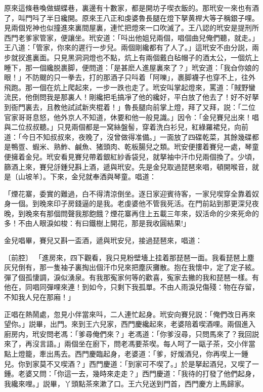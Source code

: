 原來這條巷喚做蝴蝶巷，裏邊有十數家，都是開坊子喫衣飯的。那玳安一來也有酒了，叫門呌了半日纔開。原來王八正和虔婆魯長腿在燈下拏黄桿大等子稱銀子哩。見兩個兇神也似撞進來裏間屋裏，連忙把燈來一口吹滅了。王八認的玳安是提刑所西門老爹家管家，便讓坐。玳安道：「呌出他姐兒兩個，唱個曲兒俺們聽，就走。」王八道：「管家，你來的遲行一步兒。兩個剛纔都有了人了。」這玳安不由分説，兩步就扠進裏面。只見黑洞洞燈也不點，炕上有兩個戴白毡帽子的酒太公，一個炕上睡下，那一個纔脱裹脚，便問道：「是甚麽人進屋裏來了？」玳安道：「我㒲你娘的眼！」不防颼的只一拳去，打的那酒子只呌着「阿嚛」，裹脚襪子也穿不上，往外飛跑。那一個在炕上爬起來，一步一跌也走了。玳安叫掌起燈來，罵道：「賊野蠻流民，他倒問我是那裏人！剛纔把毛搞凈了他的纔好，平白放了他去了！好不好拏到衙門裏去，且教他試試新夾棍着！」魯長腿向前掌上燈，拜了又拜，説：「二位官家哥哥息怒，他外京人不知道，休要和他一般見識。」因令：「金兒賽兒出來！唱與二位叔叔聽。」只見兩個都是一窝絲盤髻，穿着洗白衫兒，紅綠羅裙兒，向前道：「今日不知叔叔來，夜晚了，沒曾做得准備。」一面放了四碟乾菜，其餘幾碟都是鴨疍、蝦米、熟鮓、鹹魚、猪頭肉、乾板腸兒之類。玳安便摟着賽兒一處，琴童便擁着金兒。玳安看見賽兒帶着銀紅紗香袋兒，就拏袖中汗巾兒兩個換了。少頃，篩酒上來，賽兒㧱鍾兒斟上酒，遞與玳安。先是金兒取過琵琶來唱，頓開喉音，就是〔山坡羊〕。下來，金兒就奉酒與琴童。唱道：

\begin{myquote}
「煙花寨，委實的難過，白不得清涼倒坐。逐日家迎賓待客，一家兒喫穿全靠着奴身一個。到晚來印子房錢逼的是我。老虔婆他不管我死活。在門前跕到那更深兒夜晚，到晚來有那個問聲我那飽餓？煙花寨再住上五載三年來，奴活命的少來死命的多！不由人眼淚如梭：有曰鐵樹上開花，那是我收圓結果!」
\end{myquote}

金兒唱畢，賽兒又斟一盃酒，遞與玳安兒，接過琵琶來，唱道：

\begin{myquote}
{\markfont〔前腔〕}
「進房來，四下觀看，我只見粉壁墻上挂着那琵琶一面。我看琵琶上塵灰兒倒有，那一隻袖子裏掏出個汗巾兒來把塵灰攤散。抱在我懷中，定了定子絃。彈了個孤悽調，淚似湧泉。有我那寃家何等的歡喜，寃家去撇的我和琵琶一樣。有他在，同唱同彈哩來連！到如今，只剩下我孤單。不由人雨淚兒傷殘：物在存留，不知我人兒在那廂！」
\end{myquote}

正唱在熱鬧處，忽見小伴當來呌，二人連忙起身。玳安向賽兒説：「俺們改日再來望你。」説畢，出門。來到王六兒家，西門慶纔起來，老婆陪着喫酒哩。兩個進入廚房内，玳安問老馮：「爹尋俺們來？」老馮道：「你爹沒尋，只問馬來了？我回説來了，再沒言語。」兩個坐在廚下，問老馮要茶喫。每人呵了一甌子茶，交小伴當點上燈籠，牽出馬去。西門慶臨起身，老婆道：「爹，好煖酒兒，你再喫上一鍾兒。你到家莫不又喫酒？」西門慶道：「到家可不喫了。」於是拏起酒兒，又喫了一鍾。老婆又問：「你這一去，幾時來走走？」西門慶道：「我待的打發了他們起身，我纔來哩。」説畢，丫頭點茶來漱了口。王六兒送到門首，西門慶方上馬歸家。

